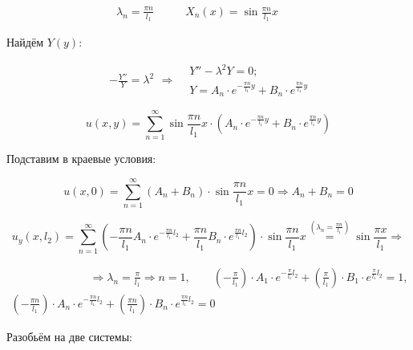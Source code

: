 \begin{equation*}
  \begin{split}
    \boxed{\lambda_{n} = \frac{\pi n}{l_{1}}}
  \end{split}
\quad\quad
  \begin{split}
    \boxed{X_{n}(x) = \sin{\frac{\pi n}{l_{1}}x}}
  \end{split}
\quad\quad
\end{equation*}

Найдём $Y(y)$:

\begin{equation*}
  \begin{split}
    - \frac{Y''}{Y} = \lambda^{2}
  \end{split}
\Rightarrow
  \begin{split}
  	& Y'' - \lambda^{2}Y = 0;\\
  	& Y = A_{n} \cdot e^{-\frac{\pi n}{l_{1}}y} + B_{n} \cdot e^{\frac{\pi n}{l_{1}}y}
  \end{split}
\end{equation*}

$$u(x, y) = \sum_{n=1}^{\infty} \sin{\frac{\pi n}{l_{1}}x}\cdot \left( A_{n}\cdot e^{-\frac{\pi n}{l_{1}}y} + B_{n} \cdot e^{\frac{\pi n}{l_{1}}y} \right)$$

Подставим в краевые условия:

$$u(x, 0) = \sum_{n=1}^{\infty} (A_{n} + B_{n}) \cdot \sin{\frac{\pi n}{l_{1}}x} = 0 \Rightarrow A_{n} + B_{n} = 0$$

$$u_{y}(x, l_{2}) = \sum_{n=1}^{\infty} \left( -\frac{\pi n}{l_{1}} A_{n} \cdot e^{-\frac{\pi n}{l_{1}}l_{2}} + \frac{\pi n}{l_{1}} B_{n} \cdot e^{\frac{\pi n}{l_{1}}l_{2}} \right) \cdot \sin{\frac{\pi n}{l_{1}}x} \stackrel{\left(\lambda_{n} = \frac{\pi n}{l_{1}} \right)}{=} \sin{\frac{\pi x}{l_{1}}} \Rightarrow$$

\begin{multline*}
    \quad\quad\quad\quad\quad\quad\quad\Rightarrow \lambda_{n} = \frac{\pi}{l_{1}} \Rightarrow n = 1, \quad\quad \left( -\frac{\pi}{l_{1}} \right) \cdot A_{1} \cdot e^{-\frac{\pi}{l_{1}}l_{2}} + \left( \frac{\pi}{l_{1}} \right) \cdot B_{1} \cdot e^{\frac{\pi}{l_{1}}l_{2}} = 1, \\
    \left( -\frac{\pi n}{l_{1}} \right) \cdot A_{n} \cdot e^{-\frac{\pi n}{l_{1}}l_{2}} + \left( \frac{\pi n}{l_{1}} \right) \cdot B_{n} \cdot e^{\frac{\pi n}{l_{1}}l_{2}} = 0
\end{multline*}

Разобьём на две системы:

